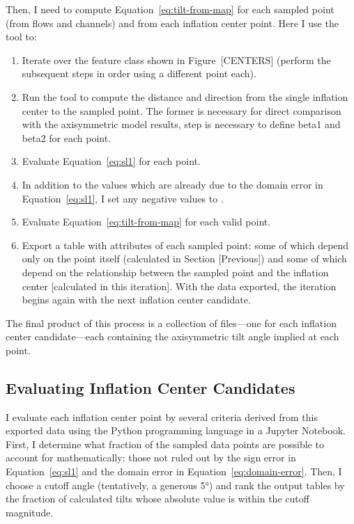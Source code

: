 Then, I need to compute Equation~\eqref{eq:tilt-from-map} for each sampled point (from flows and channels) and from each inflation center point. Here I use the  tool to:
\begin{enumerate}
    \item Iterate over the feature class shown in Figure~[CENTERS] (perform the subsequent steps in order using a different point each).
    \item Run the  tool to compute the distance and direction from the single inflation center to the sampled point. The former is necessary for direct comparison with the axisymmetric model results, step is necessary to define \acs{beta1} and \acs{beta2} for each point.
    \item Evaluate Equation~\eqref{eq:sl1} for each point.
    \item In addition to the values which are already  due to the domain error in Equation~\eqref{eq:sl1}, I set any negative values to .
    \item Evaluate Equation~\eqref{eq:tilt-from-map} for each valid point.
    \item Export a table with attributes of each sampled point: some of which depend only on the point itself (calculated in Section [Previous]) and some of which depend on the relationship between the sampled point and the inflation center [calculated in this iteration]. With the data exported, the iteration begins again with the next inflation center candidate.
\end{enumerate}
The final product of this process is a collection of  files---one for each inflation center candidate---each containing the axisymmetric tilt angle implied at each point. 


\subsection{Evaluating Inflation Center Candidates}

I evaluate each inflation center point by several criteria derived from this exported data using the Python programming language in a Jupyter Notebook. First, I determine what fraction of the sampled data points are possible to account for mathematically: those not ruled out by the sign error in Equation~\eqref{eq:sl1} and the domain error in Equation~\eqref{eq:domain-error}. Then, I choose a cutoff angle (tentatively, a generous \ang{5}) and rank the output tables by the fraction of calculated tilts whose absolute value is within the cutoff magnitude. 

